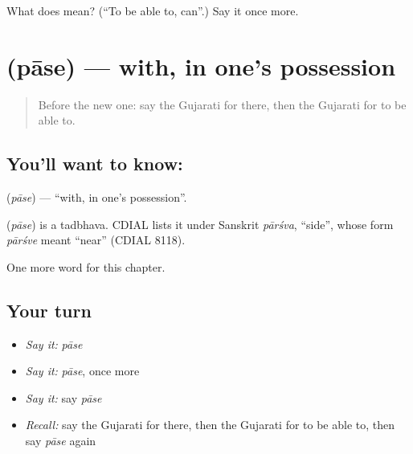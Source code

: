 \begin{tcolorbox}[breakable,colback=teal!4,colframe=teal!35!black,title={Before you move on}]
What does  mean? (\textquotedblleft{}To be able to, can\textquotedblright{}.) Say it once more.
\end{tcolorbox}
\section[\texorpdfstring{\gu{પાસે} (pāse)}{પાસે (pāse)}]{ (pāse) — with, in one's possession}

\label{lesson:GU-C102-pase}



\begin{quote}
Before the new one: say the Gujarati for there, then the Gujarati for to be able to.
\end{quote}

\subsection*{You'll want to know: }
\textbf{} (\emph{pāse}) — \textquotedblleft{}with, in one's possession\textquotedblright{}.

\begin{cousinweb}
\textbf{} (\emph{pāse}) is a tadbhava. CDIAL lists it under Sanskrit \emph{pārśva}, \textquotedblleft{}side\textquotedblright{}, whose form \emph{pārśve} meant \textquotedblleft{}near\textquotedblright{} (CDIAL 8118).
\end{cousinweb}

\begin{grammarlens}[title={What you've built}]
One more word for this chapter.
\end{grammarlens}

\subsection*{Your turn}
\begin{itemize}
\raggedright
  \item \emph{Say it:} \emph{pāse}
  \item \emph{Say it:} \emph{pāse}, once more
  \item \emph{Say it:} say \emph{pāse}
  \item \emph{Recall:} say the Gujarati for there, then the Gujarati for to be able to, then say \emph{pāse} again
\end{itemize}

